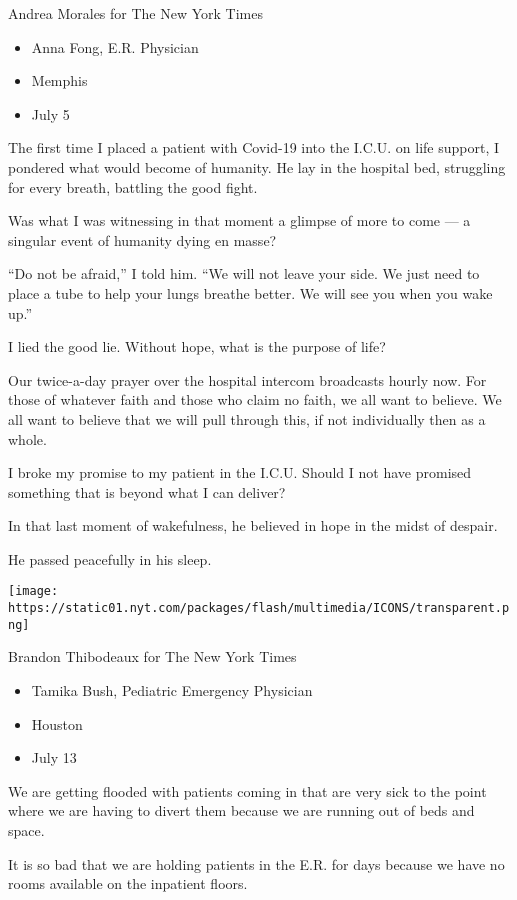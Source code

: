 Andrea Morales for The New York Times

\begin{itemize}
\tightlist
\item
  Anna Fong, E.R. Physician
\item
  Memphis
\item
  July 5
\end{itemize}

The first time I placed a patient with Covid-19 into the I.C.U. on life
support, I pondered what would become of humanity. He lay in the
hospital bed, struggling for every breath, battling the good fight.

Was what I was witnessing in that moment a glimpse of more to come --- a
singular event of humanity dying en masse?

``Do not be afraid,'' I told him. ``We will not leave your side. We just
need to place a tube to help your lungs breathe better. We will see you
when you wake up.''

I lied the good lie. Without hope, what is the purpose of life?

Our twice-a-day prayer over the hospital intercom broadcasts hourly now.
For those of whatever faith and those who claim no faith, we all want to
believe. We all want to believe that we will pull through this, if not
individually then as a whole.

I broke my promise to my patient in the I.C.U. Should I not have
promised something that is beyond what I can deliver?

In that last moment of wakefulness, he believed in hope in the midst of
despair.

He passed peacefully in his sleep.

\texttt{[image: https://static01.nyt.com/packages/flash/multimedia/ICONS/transparent.png]}

Brandon Thibodeaux for The New York Times

\begin{itemize}
\tightlist
\item
  Tamika Bush, Pediatric Emergency Physician
\item
  Houston
\item
  July 13
\end{itemize}

We are getting flooded with patients coming in that are very sick to the
point where we are having to divert them because we are running out of
beds and space.

It is so bad that we are holding patients in the E.R. for days because
we have no rooms available on the inpatient floors.

